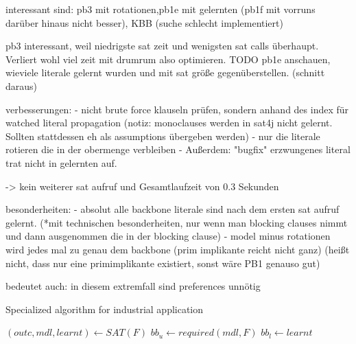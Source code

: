 interessant sind: pb3 mit rotationen,pb1e mit gelernten (pb1f mit vorruns darüber hinaus nicht besser), KBB (suche schlecht implementiert)

pb3 interessant, weil niedrigste sat zeit und wenigsten sat calls überhaupt. Verliert wohl viel zeit mit drumrum also optimieren.
TODO pb1e anschauen, wieviele literale gelernt wurden und mit sat größe gegenüberstellen. (schnitt daraus)

verbesserungen:
- nicht brute force klauseln prüfen, sondern anhand des index für watched literal propagation (notiz: monoclauses werden in sat4j nicht gelernt. Sollten stattdessen eh als assumptions übergeben werden)
- nur die literale rotieren die in der obermenge verbleiben
- Außerdem: "bugfix" erzwungenes literal trat nicht in gelernten auf.

-> kein weiterer sat aufruf und Gesamtlaufzeit von 0.3 Sekunden

besonderheiten: 
- absolut alle backbone literale sind nach dem ersten sat aufruf gelernt. (*mit technischen besonderheiten, nur wenn man blocking clauses nimmt und dann ausgenommen die in der blocking clause)
- model minus rotationen wird jedes mal zu genau dem backbone (prim implikante reicht nicht ganz) (heißt nicht, dass nur eine primimplikante existiert, sonst wäre PB1 genauso gut) 

bedeutet auch: in diesem extremfall sind preferences unnötig

\begin{algorithm}
\caption{{\sc Specialized algorithm for industrial application}}
\DontPrintSemicolon
{}
$(outc,mdl,learnt) \gets SAT(F)$\;
$bb_u \gets required(mdl,F)$\;
$bb_l \gets learnt$\;
\label{alg:thoreSpecial}
\end{algorithm}

